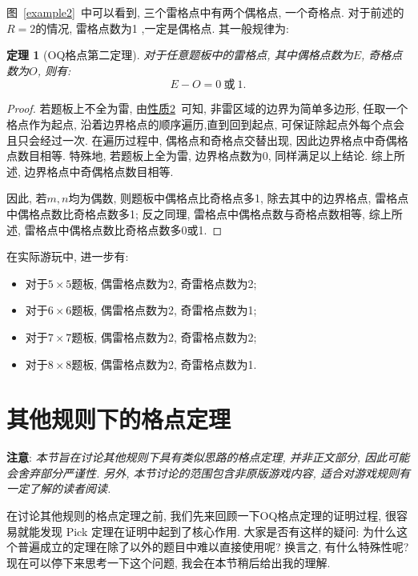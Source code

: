 \documentclass{ctexart}
\newcommand{\varible}[1]{{\Noto[#1]}}
\newtheorem{theorem}{定理}
\begin{document}
图\ \ref{example2}\ 中可以看到, 三个雷格点中有两个偶格点, 一个奇格点. 对于前述的$R = 2$的情况, 雷格点数为1 ,一定是偶格点. 其一般规律为:
\begin{theorem}[OQ格点第二定理]
    对于任意\varible{O}\varible{Q}题板中的雷格点, 其中偶格点数为$E$, 奇格点数为$O$, 则有:
    \begin{equation}
        E - O = 0\ \text{或}\ 1.
    \end{equation}    
\end{theorem}
\begin{proof}
    若题板上不全为雷, 由\hyperref[p2]{性质2}\ 可知, 非雷区域的边界为简单多边形, 任取一个格点作为起点, 沿着边界格点的顺序遍历,直到回到起点, 可保证除起点外每个点会且只会经过一次. 在遍历过程中, 偶格点和奇格点交替出现, 因此边界格点中奇偶格点数目相等. 特殊地, 若题板上全为雷, 边界格点数为0, 同样满足以上结论. 综上所述, 边界格点中奇偶格点数目相等.

    因此, 若$m,n$均为偶数, 则题板中偶格点比奇格点多1, 除去其中的边界格点, 雷格点中偶格点数比奇格点数多1; 反之同理, 雷格点中偶格点数与奇格点数相等, 综上所述, 雷格点中偶格点数比奇格点数多0或1.
\end{proof}

在实际游玩中, 进一步有:
\begin{itemize}
    \item 对于$5\times5$题板, 偶雷格点数为2, 奇雷格点数为2;
    \item 对于$6\times6$题板, 偶雷格点数为2, 奇雷格点数为1;
    \item 对于$7\times7$题板, 偶雷格点数为2, 奇雷格点数为2;
    \item 对于$8\times8$题板, 偶雷格点数为2, 奇雷格点数为1.
\end{itemize}

\section{其他规则下的格点定理}

\begin{flushleft}
    \textbf{注意}: \emph{本节旨在讨论其他规则下具有类似思路的格点定理, 并非正文部分, 因此可能会舍弃部分严谨性. 另外, 本节讨论的范围包含非原版游戏内容, 适合对游戏规则有一定了解的读者阅读.}
\end{flushleft}

在讨论其他规则的格点定理之前, 我们先来回顾一下OQ格点定理的证明过程, 很容易就能发现 Pick 定理在证明中起到了核心作用. 大家是否有这样的疑问: 为什么这个普遍成立的定理在除了\varible{O}\varible{Q}以外的题目中难以直接使用呢? 换言之, \varible{O}\varible{Q} 有什么特殊性呢? 现在可以停下来思考一下这个问题, 我会在本节稍后给出我的理解.
\end{document}
